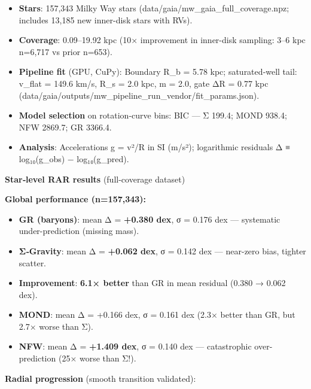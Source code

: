 \documentclass[11pt,a4paper]{article}
\begin{document}
\begin{itemize}
\item \textbf{Stars}: 157,343 Milky Way stars (data/gaia/mw\_gaia\_full\_coverage.npz; includes 13,185 new inner-disk stars with RVs).
\item \textbf{Coverage}: 0.09–19.92 kpc (10× improvement in inner-disk sampling: 3–6 kpc n=6,717 vs prior n=653).
\item \textbf{Pipeline fit} (GPU, CuPy): Boundary R\_b = 5.78 kpc; saturated‑well tail: v\_flat = 149.6 km/s, R\_s = 2.0 kpc, m = 2.0, gate ΔR = 0.77 kpc (data/gaia/outputs/mw\_pipeline\_run\_vendor/fit\_params.json).
\item \textbf{Model selection} on rotation‑curve bins: BIC — Σ 199.4; MOND 938.4; NFW 2869.7; GR 3366.4.
\item \textbf{Analysis}: Accelerations g = v²/R in SI (m/s²); logarithmic residuals Δ ≡ log₁₀(g\_obs) − log₁₀(g\_pred).
\end{itemize}


\textbf{Star‑level RAR results} (full-coverage dataset)


\textbf{Global performance (n=157,343):}

\begin{itemize}
\item \textbf{GR (baryons)}: mean Δ = \textbf{+0.380 dex}, σ = 0.176 dex — systematic under-prediction (missing mass).
\item \textbf{Σ‑Gravity}: mean Δ = \textbf{+0.062 dex}, σ = 0.142 dex — near-zero bias, tighter scatter.
\item \textbf{Improvement}: \textbf{6.1× better} than GR in mean residual (0.380 → 0.062 dex).
\item \textbf{MOND}: mean Δ = +0.166 dex, σ = 0.161 dex (2.3× better than GR, but 2.7× worse than Σ).
\item \textbf{NFW}: mean Δ = \textbf{+1.409 dex}, σ = 0.140 dex — catastrophic over-prediction (25× worse than Σ!).
\end{itemize}


\textbf{Radial progression} (smooth transition validated):
\end{document}
